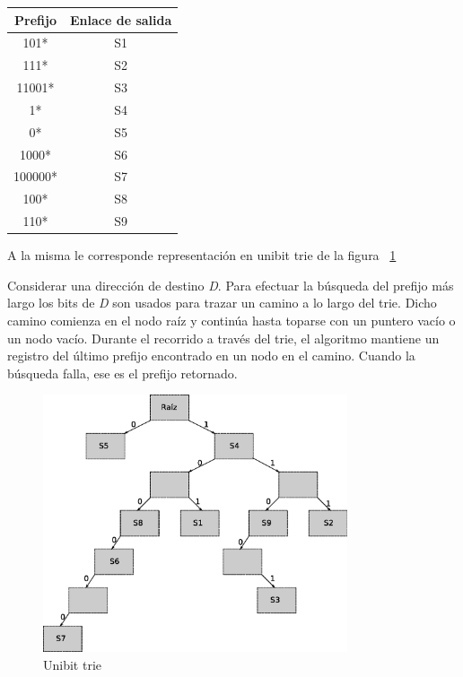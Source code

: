 \begin{center}
	\begin{tabular}{|c|c|} \hline
		\textbf{Prefijo} & \textbf{Enlace de salida} \\ \hline
		101* & S1 \\
		111* & S2 \\
		11001* & S3 \\
		1* & S4 \\
		0* & S5 \\
		1000* & S6 \\
		100000* & S7 \\
		100* & S8 \\
		110* & S9 \\	\hline
	\end{tabular}	
\end{center}




A la misma le corresponde representación en unibit trie de la figura ~\ref{fig:trie}

Considerar una dirección de destino \textit{D}. Para efectuar la búsqueda del prefijo más largo los bits de \textit{D} son usados para trazar un camino a lo largo del trie. Dicho camino comienza en el nodo raíz y continúa hasta toparse con un puntero vacío o un nodo vacío. Durante el recorrido a través del trie, el algoritmo mantiene un registro del último prefijo encontrado en un nodo en el camino. Cuando la búsqueda falla, ese es el prefijo retornado.
\newpage
\begin{figure}[h]
  \centering
	\includegraphics[width=0.80\textwidth]{2-sistema/graf/trie.eps}
  \caption{Unibit trie}
  \label{fig:trie}
\end{figure}

